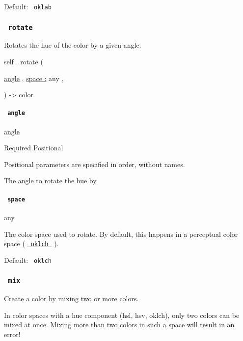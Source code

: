 Default: \texttt{\ oklab\ }

\subsubsection{\texorpdfstring{\texttt{\ rotate\ }}{ rotate }}\label{definitions-rotate}

Rotates the hue of the color by a given angle.

self { . } { rotate } (

{ \href{/docs/reference/layout/angle/}{angle} , } {
\hyperref[definitions-rotate-parameters-space]{space :} { any } , }

) -\textgreater{} \href{/docs/reference/visualize/color/}{color}

\paragraph{\texorpdfstring{\texttt{\ angle\ }}{ angle }}\label{definitions-rotate-angle}

\href{/docs/reference/layout/angle/}{angle}

{Required} {{ Positional }}

\label{definitions-rotate-angle-positional-tooltip}
Positional parameters are specified in order, without names.

The angle to rotate the hue by.

\paragraph{\texorpdfstring{\texttt{\ space\ }}{ space }}\label{definitions-rotate-space}

{ any }

The color space used to rotate. By default, this happens in a perceptual
color space (
\href{/docs/reference/visualize/color/\#definitions-oklch}{\texttt{\ oklch\ }}
).

Default: \texttt{\ oklch\ }

\subsubsection{\texorpdfstring{\texttt{\ mix\ }}{ mix }}\label{definitions-mix}

Create a color by mixing two or more colors.

In color spaces with a hue component (hsl, hsv, oklch), only two colors
can be mixed at once. Mixing more than two colors in such a space will
result in an error!

